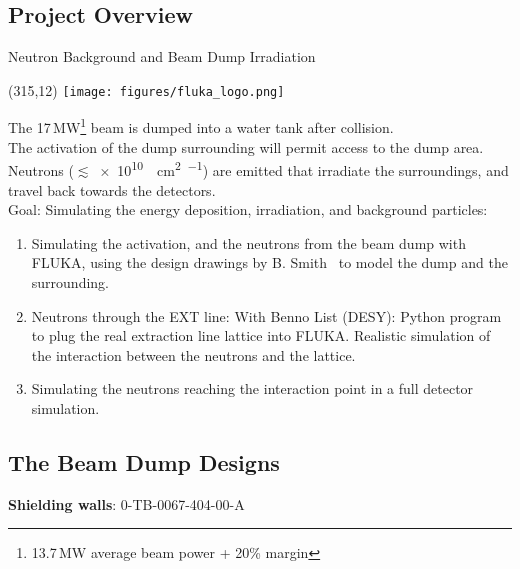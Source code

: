 \documentclass[xcolor={dvipsnames}]{beamer}
\newcommand{\flukalogo}{
  \setlength{\TPHorizModule}{1pt}
  \setlength{\TPVertModule}{1pt}
  \begin{textblock}{1}(315,12)
   \texttt{[image: figures/fluka\_logo.png]}
  \end{textblock}
}
\begin{document}
\subsection{Project Overview}
{
\begin{frame}{Neutron Background and Beam Dump Irradiation}
\flukalogo
The 17\,MW\footnote{13.7\,MW average beam power + 20\% margin} beam is dumped into a water tank after collision.\\The activation of the dump surrounding will permit access to the dump area. Neutrons ($\lesssim$\SI{e10}{\per\square\centi\metre\per\year}) are emitted that irradiate the surroundings, and travel back towards the detectors.~\cite{SLAC_FLUKA}\\
\vspace*{0.1cm}
\alert{Goal: Simulating the energy deposition, irradiation, and background particles:}
\begin{enumerate}
 \item Simulating the activation, and the neutrons from the beam dump with FLUKA, using the design drawings by B. Smith~\cite{Smith} to model the dump and the surrounding.
 \item Neutrons through the EXT line: With Benno List (DESY): Python program to plug the real extraction line lattice into FLUKA. Realistic simulation of the interaction between the neutrons and the lattice.
 \item Simulating the neutrons reaching the interaction point in a full detector simulation.
\end{enumerate}
\end{frame}
}


\subsection{The Beam Dump Designs}
\begin{frame}{\textbf{Shielding walls}: 0-TB-0067-404-00-A}
\begin{center}
\end{center}
\end{frame}
\end{document}
